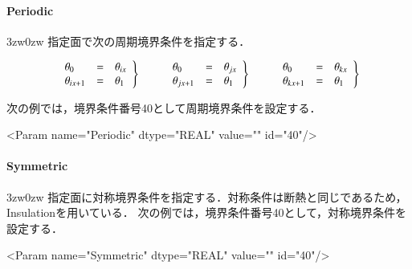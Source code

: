 %
\paragraph{Periodic}
\begin{indentation}{3zw}{0zw}
指定面で次の周期境界条件を指定する．

\begin{equation}
\begin{array}{lll}

\left.
\begin{array}{lll}
\theta_0 & = & \theta_{ix}\\
\theta_{ix+1} & = & \theta_1\\
\end{array}
\right \}
\hspace{5mm}
&
\left.
\begin{array}{lll}
\theta_0 & = & \theta_{jx}\\
\theta_{jx+1} & = & \theta_1\\
\end{array}
\right \}
\hspace{5mm}
&
\left.
\begin{array}{lll}
\theta_0 & = & \theta_{kx}\\
\theta_{kx+1} & = & \theta_1\\
\end{array}
\right \}

\end{array}
\label{eq:periodic_temp}
\end{equation}

次の例では，境界条件番号40として周期境界条件を設定する．
{ \small
\begin{program}
<Param name="Periodic" dtype="REAL" value="" id="40"/>
\end{program}
}
\end{indentation}

%
\paragraph{Symmetric}
\begin{indentation}{3zw}{0zw}
指定面に対称境界条件を指定する．対称条件は断熱と同じであるため，Insulationを用いている．
次の例では，境界条件番号40として，対称境界条件を設定する．
{ \small
\begin{program}
<Param name="Symmetric" dtype="REAL" value="" id="40"/>
\end{program}
}
\end{indentation}

